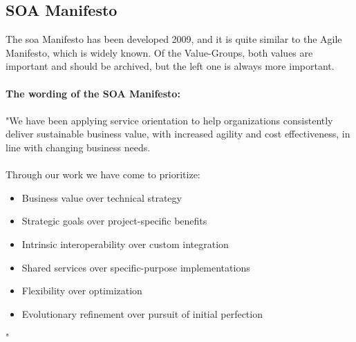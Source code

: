 \documentclass[12pt]{article}
\begin{document}
\subsection{SOA Manifesto}
The \gls{soa} Manifesto has been developed 2009, and it is quite similar to the Agile Manifesto, which is widely known. Of the Value-Groups, both values are important and should be archived, but the left one is always more important. \\ \\
\textbf{The wording of the SOA Manifesto:}\\ \\ 
"We have been applying service orientation to help organizations 
consistently deliver sustainable business value, with increased agility
and cost effectiveness, in line with changing business needs. \\ \\
Through our work we have come to prioritize: \\
\begin{itemize}
\item Business value over technical strategy 
\item Strategic goals over project-specific benefits 
\item Intrinsic interoperability over custom integration 
\item Shared services over specific-purpose implementations 
\item Flexibility over optimization
\item Evolutionary refinement over pursuit of initial perfection
\end{itemize}" \cite{soamaifesto}
\end{document}
